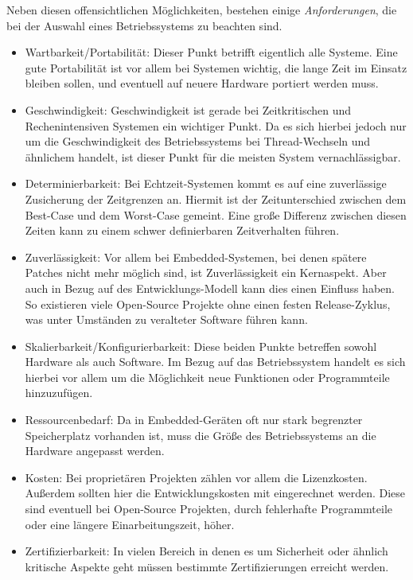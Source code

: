 \documentclass[
  a4paper,					%
  twoside,
  DIV=calc,     				%
  bibliography=totoc,
  cleardoublepage=empty,
  ngerman,     					%
  final       					%
]{scrbook}
\begin{document}
Neben diesen offensichtlichen Möglichkeiten, bestehen einige \emph{Anforderungen}\cite{rtos_choose}, die bei der Auswahl eines Betriebssystems zu beachten sind.

\begin{itemize}
	\item Wartbarkeit/Portabilität: Dieser Punkt betrifft eigentlich alle Systeme. Eine gute Portabilität ist vor allem bei Systemen wichtig, die lange Zeit im Einsatz bleiben sollen, und eventuell auf neuere Hardware portiert werden muss.

	\item Geschwindigkeit: Geschwindigkeit ist gerade bei Zeitkritischen und Rechenintensiven Systemen ein wichtiger Punkt. Da es sich hierbei jedoch nur um die Geschwindigkeit des Betriebssystems bei Thread-Wechseln und ähnlichem handelt, ist dieser Punkt für die meisten System vernachlässigbar.

	\item Determinierbarkeit: Bei Echtzeit-Systemen kommt es auf eine zuverlässige Zusicherung der Zeitgrenzen an. Hiermit ist der Zeitunterschied zwischen dem Best-Case und dem Worst-Case gemeint. Eine große Differenz zwischen diesen Zeiten kann zu einem schwer definierbaren Zeitverhalten führen.

	\item Zuverlässigkeit: Vor allem bei Embedded-Systemen, bei denen spätere Patches nicht mehr möglich sind, ist Zuverlässigkeit ein Kernaspekt. Aber auch in Bezug auf des Entwicklungs-Modell kann dies einen Einfluss haben. So existieren viele Open-Source Projekte ohne einen festen Release-Zyklus, was unter Umständen zu veralteter Software führen kann.

	\item Skalierbarkeit/Konfigurierbarkeit: Diese beiden Punkte betreffen sowohl Hardware als auch Software. Im Bezug auf das Betriebssystem handelt es sich hierbei vor allem um die Möglichkeit neue Funktionen oder Programmteile hinzuzufügen.

	\item Ressourcenbedarf: Da in Embedded-Geräten oft nur stark begrenzter Speicherplatz vorhanden ist, muss die Größe des Betriebssystems an die Hardware angepasst werden.

	\item Kosten: Bei proprietären Projekten zählen vor allem die Lizenzkosten. Außerdem sollten hier die Entwicklungskosten mit eingerechnet werden. Diese sind eventuell bei Open-Source Projekten, durch fehlerhafte Programmteile oder eine längere Einarbeitungszeit, höher.

	\item Zertifizierbarkeit: In vielen Bereich in denen es um Sicherheit oder ähnlich kritische Aspekte geht müssen bestimmte Zertifizierungen erreicht werden. 

\end{itemize}
\end{document}

